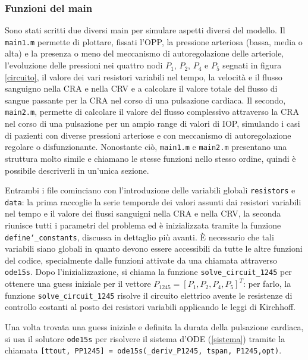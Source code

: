 \documentclass{article}
\begin{document}
\subsubsection*{Funzioni del main}
Sono stati scritti due diversi main per simulare aspetti diversi del modello.
Il \texttt{main1.m} permette di plottare, fissati l'OPP, la pressione arteriosa (bassa, media o alta) e la presenza o meno del meccanismo di autoregolazione delle arteriole, l'evoluzione delle pressioni nei quattro nodi $P_1$, $P_2$, $P_4$ e $P_5$ segnati in figura \ref{circuito}, il valore dei vari resistori variabili nel tempo, la velocità e il flusso sanguigno nella CRA e nella CRV e a calcolare il valore totale del flusso di sangue passante per la CRA nel corso di una pulsazione cardiaca.
Il secondo, \texttt{main2.m}, permette di calcolare il valore del flusso complessivo attraverso la CRA nel corso di una pulsazione per un ampio range di valori di IOP, simulando i casi di pazienti con diverse pressioni arteriose e con meccanismo di autoregolazione regolare o disfunzionante.
Nonostante ciò, \texttt{main1.m} e \texttt{main2.m} presentano una struttura molto simile e chiamano le stesse funzioni nello stesso ordine, quindi è possibile descriverli in un'unica sezione.

Entrambi i file cominciano con l'introduzione delle variabili globali \texttt{resistors} e \texttt{data}: la prima raccoglie la serie temporale dei valori assunti dai resistori variabili nel tempo e il valore dei flussi sanguigni nella CRA e nella CRV, la seconda riunisce tutti i parametri del problema ed è inizializzata tramite la funzione \texttt{define\char`_constants}, discussa in dettaglio più avanti.
È necessario che tali variabili siano globali in quanto devono essere accessibili da tutte le altre funzioni del codice, specialmente dalle funzioni attivate da una chiamata attraverso \texttt{ode15s}.
Dopo l'inizializzazione, si chiama la funzione \texttt{solve\_circuit\_1245} per ottenere una guess iniziale per il vettore $P_{1245} = [P_1, P_2, P_4, P_5]^T$: per farlo, la funzione \texttt{solve\_circuit\_1245} risolve il circuito elettrico avente le resistenze di controllo costanti al posto dei resistori variabili applicando le leggi di Kirchhoff.

Una volta trovata una guess iniziale e definita la durata della pulsazione cardiaca, si usa il solutore \texttt{ode15s} per risolvere il sistema d'ODE (\ref{sistema}) tramite la chiamata \texttt{[ttout, PP1245] = ode15s(\@time\_deriv\_P1245, tspan, P1245,opt)}.
\end{document}

